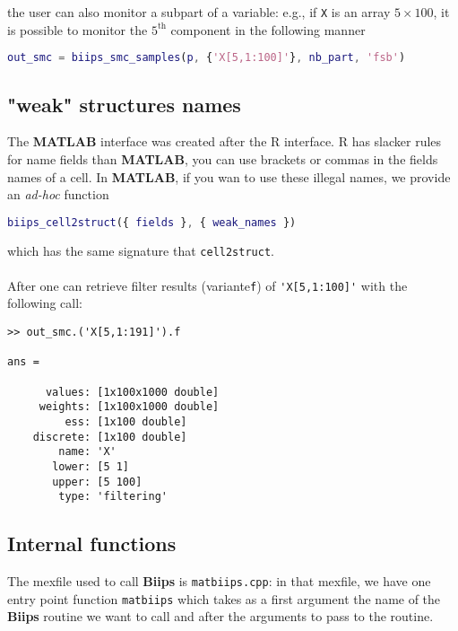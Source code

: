 \documentclass[11pt,twoside]{article}
\newcommand{\biips}{{\bf Biips}{}}
\newcommand{\matlab}{{\bf MATLAB}{}}
\begin{document}
  the user can also monitor a subpart of a variable: e.g., if \verb!X! is an array $5\times100$, it is possible to monitor the $5^{\mbox{th}}$ component 
  in the following manner 
\begin{lstlisting}[language=matlab]
out_smc = biips_smc_samples(p, {'X[5,1:100]'}, nb_part, 'fsb')
\end{lstlisting}
  
  \subsection{"weak" structures names} 
     
     The \matlab{} interface was created after the R interface. R has slacker rules for name fields than \matlab{}, you can use
     brackets or commas in the fields names of a cell. In \matlab{}, if you wan to use these illegal names, we provide 
     an {\em ad-hoc} function
\begin{lstlisting}[language=matlab]
biips_cell2struct({ fields }, { weak_names }) 
\end{lstlisting}
     which has the same signature that \verb!cell2struct!.
     
  \paragraph{}
     After one can retrieve filter results (variante\verb!f!) of \verb!'X[5,1:100]'! with the following call: 
\begin{lstlisting}
>> out_smc.('X[5,1:191]').f

ans = 

      values: [1x100x1000 double]
     weights: [1x100x1000 double]
         ess: [1x100 double]
    discrete: [1x100 double]
        name: 'X'
       lower: [5 1]
       upper: [5 100]
        type: 'filtering'
\end{lstlisting}

   \subsection{Internal functions}

    The mexfile used to call \biips{} is \texttt{matbiips.cpp}: in that mexfile, we have one entry point function \texttt{matbiips} which takes as a first 
    argument the name of the \biips{} routine we want to call and after the arguments to pass to the routine.
\end{document}
